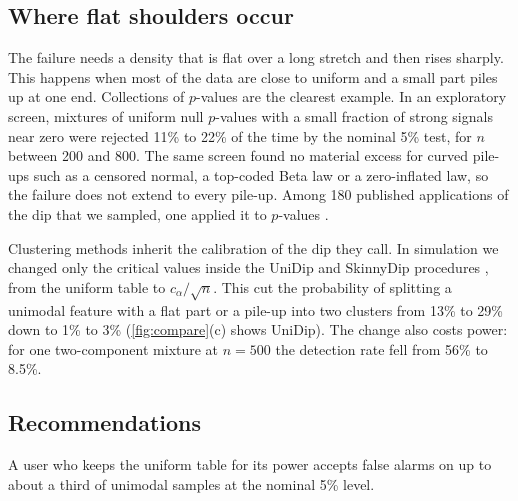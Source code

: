 \subsection{Where flat shoulders occur}
The failure needs a density that is flat over a long stretch and then rises sharply. This happens when most of the data are close to uniform and a small part piles up at one end. Collections of $p$-values are the clearest example. In an exploratory screen, mixtures of uniform null $p$-values with a small fraction of strong signals near zero were rejected 11\% to 22\% of the time by the nominal 5\% test, for $n$ between 200 and 800. The same screen found no material excess for curved pile-ups such as a censored normal, a top-coded Beta law or a zero-inflated law, so the failure does not extend to every pile-up. Among 180 published applications of the dip that we sampled, one applied it to $p$-values \cite{Roy26}.

Clustering methods inherit the calibration of the dip they call. In simulation we changed only the critical values inside the UniDip and SkinnyDip procedures \cite{Maurus16}, from the uniform table to $c_\alpha/\sqrt n$. This cut the probability of splitting a unimodal feature with a flat part or a pile-up into two clusters from 13\% to 29\% down to 1\% to 3\% (\cref{fig:compare}(c) shows UniDip). The change also costs power: for one two-component mixture at $n=500$ the detection rate fell from 56\% to 8.5\%.

\subsection{Recommendations}
\noindent{}

\vspace{10pt}\noindent A user who keeps the uniform table for its power accepts false alarms on up to about a third of unimodal samples at the nominal 5\% level.
